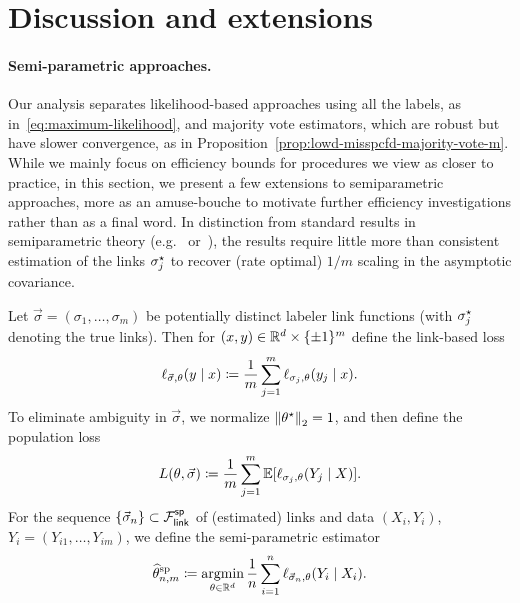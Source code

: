 \section{Discussion and extensions}

\paragraph{Semi-parametric approaches.}
\label{sec:semi-param}
\label{sec:master-results-sem}

Our analysis separates likelihood-based approaches using all the labels, as
in~\eqref{eq:maximum-likelihood}, and majority vote estimators, which are
robust but have slower convergence, as in
Proposition~\ref{prop:lowd-misspcfd-majority-vote-m}.
%
While we mainly focus on efficiency bounds for 
procedures we view as closer to practice,
in this section, we
present a few extensions to semiparametric approaches, more
as an amuse-bouche to motivate further efficiency investigations
rather than as a final word.
%
In distinction from standard results in semiparametric theory
(e.g.~\cite[Ch.~25]{VanDerVaart98} or~\cite{BickelKlRiWe98}), the results
require little more than consistent estimation of the links $\sigma_j^\star$
to recover (rate optimal) $1/m$ scaling in the asymptotic covariance.

Let $\vec{\sigma} = (\sigma_1, \ldots, \sigma_m)$
be potentially distinct labeler link functions
(with $\sigma_j^\star$ denoting the true links).
Then for
$(x, y) \in \mathbb{R}^d \times \{\pm 1\}^m$ define the link-based loss
\begin{equation*}
  \ell_{\vec{\sigma}, \theta}(y \mid x)
  \coloneqq \frac{1}{m} \sum_{j = 1}^m \ell_{\sigma_j,\theta}(y_j \mid x).
\end{equation*}
%
To eliminate ambiguity in $\vec{\sigma}$,
we normalize $\left\|{\theta^\star}\right\|_2 = 1$,
and then define the population loss
\begin{equation*}
	L(\theta, \vec{\sigma})
	\coloneqq \frac{1}{m} \sum_{j = 1}^m
	\mathbb{E}[\ell_{\sigma_j, \theta}(Y_j \mid X)].
\end{equation*}
For the sequence $\{\vec{\sigma}_n\} \subset \mathcal{F}_{\mathsf{link}}^{\mathsf{sp}}$
of (estimated) links and data $(X_i,
Y_i)$, $Y_i = (Y_{i1}, \ldots, Y_{im})$, we define the semi-parametric
estimator
\begin{align*}
	\widehat{\theta}^{\textup{sp}}_{n,m} \coloneqq \operatorname*{argmin}_{\theta \in \mathbb{R}^d}
	\frac{1}{n} \sum_{i = 1}^n
	\ell_{\vec{\sigma}_n, \theta}(Y_i \mid X_i).
\end{align*}

